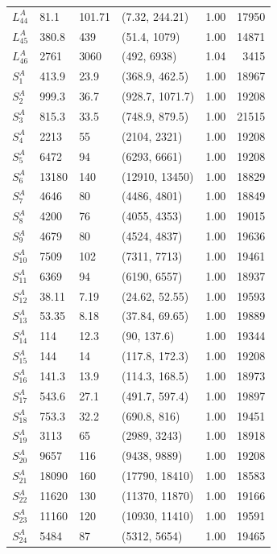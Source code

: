 \documentclass[
]{article}
\begin{document}
\begin{longtable}{llllrr}
$L^A_{44}$ & 81.1 & 101.71 & (7.32, 244.21) & 1.00 & 17950\\
$L^A_{45}$ & 380.8 & 439 & (51.4, 1079) & 1.00 & 14871\\
\addlinespace
$L^A_{46}$ & 2761 & 3060 & (492, 6938) & 1.04 & 3415\\
$S^A_{1}$ & 413.9 & 23.9 & (368.9, 462.5) & 1.00 & 18967\\
$S^A_{2}$ & 999.3 & 36.7 & (928.7, 1071.7) & 1.00 & 19208\\
$S^A_{3}$ & 815.3 & 33.5 & (748.9, 879.5) & 1.00 & 21515\\
$S^A_{4}$ & 2213 & 55 & (2104, 2321) & 1.00 & 19208\\
\addlinespace
$S^A_{5}$ & 6472 & 94 & (6293, 6661) & 1.00 & 19208\\
$S^A_{6}$ & 13180 & 140 & (12910, 13450) & 1.00 & 18829\\
$S^A_{7}$ & 4646 & 80 & (4486, 4801) & 1.00 & 18849\\
$S^A_{8}$ & 4200 & 76 & (4055, 4353) & 1.00 & 19015\\
$S^A_{9}$ & 4679 & 80 & (4524, 4837) & 1.00 & 19636\\
\addlinespace
$S^A_{10}$ & 7509 & 102 & (7311, 7713) & 1.00 & 19461\\
$S^A_{11}$ & 6369 & 94 & (6190, 6557) & 1.00 & 18937\\
$S^A_{12}$ & 38.11 & 7.19 & (24.62, 52.55) & 1.00 & 19593\\
$S^A_{13}$ & 53.35 & 8.18 & (37.84, 69.65) & 1.00 & 19889\\
$S^A_{14}$ & 114 & 12.3 & (90, 137.6) & 1.00 & 19344\\
\addlinespace
$S^A_{15}$ & 144 & 14 & (117.8, 172.3) & 1.00 & 19208\\
$S^A_{16}$ & 141.3 & 13.9 & (114.3, 168.5) & 1.00 & 18973\\
$S^A_{17}$ & 543.6 & 27.1 & (491.7, 597.4) & 1.00 & 19897\\
$S^A_{18}$ & 753.3 & 32.2 & (690.8, 816) & 1.00 & 19451\\
$S^A_{19}$ & 3113 & 65 & (2989, 3243) & 1.00 & 18918\\
\addlinespace
$S^A_{20}$ & 9657 & 116 & (9438, 9889) & 1.00 & 19208\\
$S^A_{21}$ & 18090 & 160 & (17790, 18410) & 1.00 & 18583\\
$S^A_{22}$ & 11620 & 130 & (11370, 11870) & 1.00 & 19166\\
$S^A_{23}$ & 11160 & 120 & (10930, 11410) & 1.00 & 19591\\
$S^A_{24}$ & 5484 & 87 & (5312, 5654) & 1.00 & 19465\\

\end{longtable}
\end{document}
